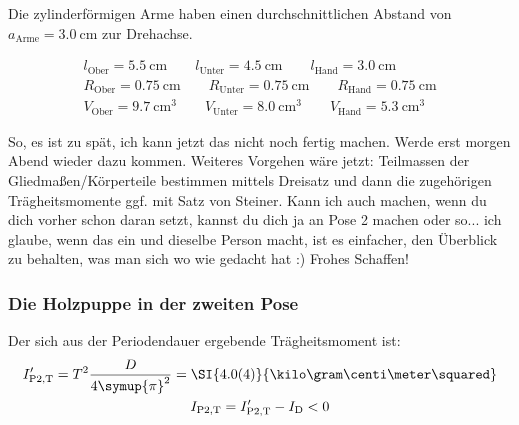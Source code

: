 Die zylinderförmigen Arme haben einen durchschnittlichen Abstand von ${a_\text{Arme}=\SI{3.0}{\centi\meter}}$ zur Drehachse. 

\begin{gather}
    l_\text{Ober}=\SI{5.5}{\centi\meter} \quad \quad 
    l_\text{Unter}=\SI{4.5}{\centi\meter} \quad \quad 
    l_\text{Hand}=\SI{3.0}{\centi\meter} \\
    R_\text{Ober}=\SI{0.75}{\centi\meter} \quad \quad 
    R_\text{Unter}=\SI{0.75}{\centi\meter} \quad \quad 
    R_\text{Hand}=\SI{0.75}{\centi\meter} \\
    V_\text{Ober}=\SI{9.7}{\centi\meter\tothe{3}} \quad \quad 
    V_\text{Unter}=\SI{8.0}{\centi\meter\tothe{3}}\quad \quad 
    V_\text{Hand}=\SI{5.3}{\centi\meter\tothe{3}}
\end{gather}

So, es ist zu spät, ich kann jetzt das nicht noch fertig machen. Werde erst morgen Abend wieder dazu kommen. 
Weiteres Vorgehen wäre jetzt:
Teilmassen der Gliedmaßen/Körperteile bestimmen mittels Dreisatz und dann die zugehörigen Trägheitsmomente ggf. mit Satz 
von Steiner. 
Kann ich auch machen, wenn du dich vorher schon daran setzt, kannst du dich ja an Pose 2 machen oder so...  
ich glaube, wenn das ein und dieselbe Person macht, ist es einfacher, den Überblick zu behalten, was man sich wo wie gedacht hat :) 
Frohes Schaffen!

\FloatBarrier
\subsubsection{Die Holzpuppe in der zweiten Pose}

Der sich aus der Periodendauer ergebende Trägheitsmoment ist: 
\begin{gather}
    I'_\text{P2,T}=T^2\frac{D}{4\symup{\pi}^2}=\SI{4.0(4)}{\kilo\gram\centi\meter\squared} \\
    I_\text{P2,T}=I'_\text{P2,T}-I_\text{D} <0 
\end{gather}